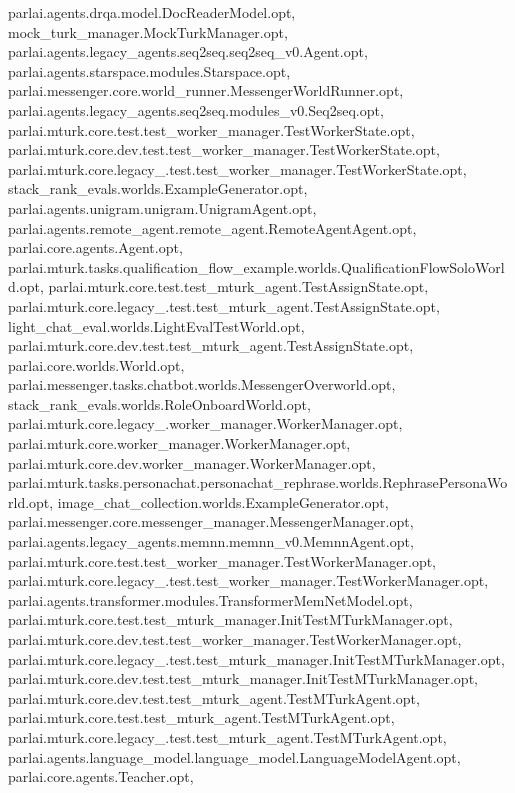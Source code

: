 parlai.\+agents.\+drqa.\+model.\+Doc\+Reader\+Model.\+opt, mock\+\_\+turk\+\_\+manager.\+Mock\+Turk\+Manager.\+opt, parlai.\+agents.\+legacy\+\_\+agents.\+seq2seq.\+seq2seq\+\_\+v0.\+Agent.\+opt, parlai.\+agents.\+starspace.\+modules.\+Starspace.\+opt, parlai.\+messenger.\+core.\+world\+\_\+runner.\+Messenger\+World\+Runner.\+opt, parlai.\+agents.\+legacy\+\_\+agents.\+seq2seq.\+modules\+\_\+v0.\+Seq2seq.\+opt, parlai.\+mturk.\+core.\+test.\+test\+\_\+worker\+\_\+manager.\+Test\+Worker\+State.\+opt, parlai.\+mturk.\+core.\+dev.\+test.\+test\+\_\+worker\+\_\+manager.\+Test\+Worker\+State.\+opt, parlai.\+mturk.\+core.\+legacy\+\_.\+test.\+test\+\_\+worker\+\_\+manager.\+Test\+Worker\+State.\+opt, stack\+\_\+rank\+\_\+evals.\+worlds.\+Example\+Generator.\+opt, parlai.\+agents.\+unigram.\+unigram.\+Unigram\+Agent.\+opt, parlai.\+agents.\+remote\+\_\+agent.\+remote\+\_\+agent.\+Remote\+Agent\+Agent.\+opt, parlai.\+core.\+agents.\+Agent.\+opt, parlai.\+mturk.\+tasks.\+qualification\+\_\+flow\+\_\+example.\+worlds.\+Qualification\+Flow\+Solo\+World.\+opt, parlai.\+mturk.\+core.\+test.\+test\+\_\+mturk\+\_\+agent.\+Test\+Assign\+State.\+opt, parlai.\+mturk.\+core.\+legacy\+\_.\+test.\+test\+\_\+mturk\+\_\+agent.\+Test\+Assign\+State.\+opt, light\+\_\+chat\+\_\+eval.\+worlds.\+Light\+Eval\+Test\+World.\+opt, parlai.\+mturk.\+core.\+dev.\+test.\+test\+\_\+mturk\+\_\+agent.\+Test\+Assign\+State.\+opt, parlai.\+core.\+worlds.\+World.\+opt, parlai.\+messenger.\+tasks.\+chatbot.\+worlds.\+Messenger\+Overworld.\+opt, stack\+\_\+rank\+\_\+evals.\+worlds.\+Role\+Onboard\+World.\+opt, parlai.\+mturk.\+core.\+legacy\+\_.\+worker\+\_\+manager.\+Worker\+Manager.\+opt, parlai.\+mturk.\+core.\+worker\+\_\+manager.\+Worker\+Manager.\+opt, parlai.\+mturk.\+core.\+dev.\+worker\+\_\+manager.\+Worker\+Manager.\+opt, parlai.\+mturk.\+tasks.\+personachat.\+personachat\+\_\+rephrase.\+worlds.\+Rephrase\+Persona\+World.\+opt, image\+\_\+chat\+\_\+collection.\+worlds.\+Example\+Generator.\+opt, parlai.\+messenger.\+core.\+messenger\+\_\+manager.\+Messenger\+Manager.\+opt, parlai.\+agents.\+legacy\+\_\+agents.\+memnn.\+memnn\+\_\+v0.\+Memnn\+Agent.\+opt, parlai.\+mturk.\+core.\+test.\+test\+\_\+worker\+\_\+manager.\+Test\+Worker\+Manager.\+opt, parlai.\+mturk.\+core.\+legacy\+\_.\+test.\+test\+\_\+worker\+\_\+manager.\+Test\+Worker\+Manager.\+opt, parlai.\+agents.\+transformer.\+modules.\+Transformer\+Mem\+Net\+Model.\+opt, parlai.\+mturk.\+core.\+test.\+test\+\_\+mturk\+\_\+manager.\+Init\+Test\+M\+Turk\+Manager.\+opt, parlai.\+mturk.\+core.\+dev.\+test.\+test\+\_\+worker\+\_\+manager.\+Test\+Worker\+Manager.\+opt, parlai.\+mturk.\+core.\+legacy\+\_.\+test.\+test\+\_\+mturk\+\_\+manager.\+Init\+Test\+M\+Turk\+Manager.\+opt, parlai.\+mturk.\+core.\+dev.\+test.\+test\+\_\+mturk\+\_\+manager.\+Init\+Test\+M\+Turk\+Manager.\+opt, parlai.\+mturk.\+core.\+dev.\+test.\+test\+\_\+mturk\+\_\+agent.\+Test\+M\+Turk\+Agent.\+opt, parlai.\+mturk.\+core.\+test.\+test\+\_\+mturk\+\_\+agent.\+Test\+M\+Turk\+Agent.\+opt, parlai.\+mturk.\+core.\+legacy\+\_.\+test.\+test\+\_\+mturk\+\_\+agent.\+Test\+M\+Turk\+Agent.\+opt, parlai.\+agents.\+language\+\_\+model.\+language\+\_\+model.\+Language\+Model\+Agent.\+opt, parlai.\+core.\+agents.\+Teacher.\+opt, 
